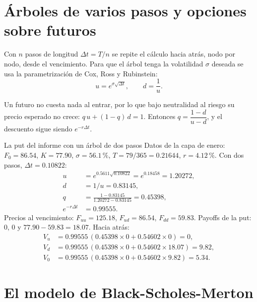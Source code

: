 \section{Árboles de varios pasos y opciones sobre futuros}

Con $n$ pasos de longitud $\Delta t=T/n$ se repite el cálculo hacia atrás, nodo por nodo, desde el vencimiento. Para que el árbol tenga la volatilidad $\sigma$ deseada se usa la parametrización de Cox, Ross y Rubinstein:
\[ u=e^{\sigma\sqrt{\Delta t}},\qquad d=\frac1u. \]

\begin{adicional}
Un futuro no cuesta nada al entrar, por lo que bajo neutralidad al riesgo su precio esperado no crece: $q\,u+(1-q)\,d=1$. Entonces $q=\dfrac{1-d}{u-d}$, y el descuento sigue siendo $e^{-r\Delta t}$.
\end{adicional}

\begin{ejemplo}{La put del informe con un árbol de dos pasos}
Datos de la capa de enero: $F_0=86.54$, $K=77.90$, $\sigma=56.1\,\%$, $T=79/365=0.21644$, $r=4.12\,\%$. Con dos pasos, $\Delta t=0.10822$:
\begin{align*}
u&=e^{0.5611\sqrt{0.10822}}=e^{0.18458}=1.20272,\\
d&=1/u=0.83145,\\
q&=\frac{1-0.83145}{1.20272-0.83145}=0.45398,\\
e^{-r\Delta t}&=0.99555.
\end{align*}
Precios al vencimiento: $F_{uu}=125.18$, $F_{ud}=86.54$, $F_{dd}=59.83$. Payoffs de la put: $0$, $0$ y $77.90-59.83=18.07$. Hacia atrás:
\begin{align*}
V_u&=0.99555\,(0.45398\times0+0.54602\times0)=0,\\
V_d&=0.99555\,(0.45398\times0+0.54602\times18.07)=9.82,\\
V_0&=0.99555\,(0.45398\times0+0.54602\times9.82)=5.34.
\end{align*}
\end{ejemplo}



\section{El modelo de Black-Scholes-Merton}

